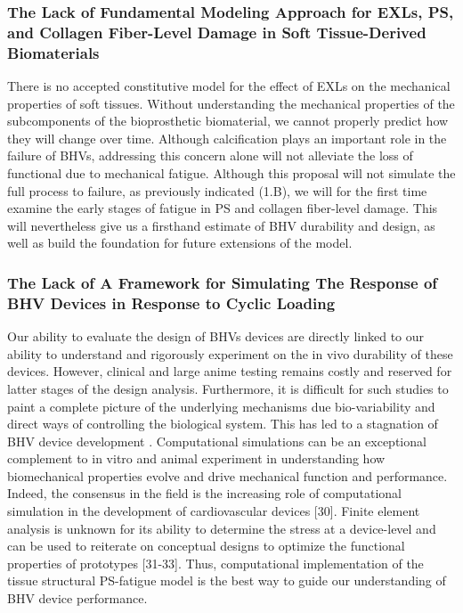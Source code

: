 \subsubsection{The Lack of Fundamental Modeling Approach for EXLs, PS, and Collagen Fiber-Level Damage in Soft Tissue-Derived Biomaterials}

    There is no accepted constitutive model for the effect of EXLs on the mechanical properties of soft tissues. Without understanding the mechanical properties of the subcomponents of the bioprosthetic biomaterial, we cannot properly predict how they will change over time. Although calcification plays an important role in the failure of BHVs, addressing this concern alone will not alleviate the loss of functional due to mechanical fatigue. Although this proposal will not simulate the full process to failure, as previously indicated (1.B), we will for the first time examine the early stages of fatigue in PS and collagen fiber-level damage. This will nevertheless give us a firsthand estimate of BHV durability and design, as well as build the foundation for future extensions of the model.

\subsubsection{The Lack of A Framework for Simulating The Response of BHV Devices in Response to Cyclic Loading}

    Our ability to evaluate the design of BHVs devices are directly linked to our ability to understand and rigorously experiment on the in vivo durability of these devices. However, clinical and large anime testing remains costly and reserved for latter stages of the design analysis. Furthermore, it is difficult for such studies to paint a complete picture of the underlying mechanisms due bio-variability and direct ways of controlling the biological system. This has led to a stagnation of BHV device development \cite{schoen_cardiac_2005}. Computational simulations can be an exceptional complement to in vitro and animal experiment in understanding how biomechanical properties evolve and drive mechanical function and performance. Indeed, the consensus in the field is the increasing role of computational simulation in the development of cardiovascular devices [30]. Finite element analysis is unknown for its ability to determine the stress at a device-level and can be used to reiterate on conceptual designs to optimize the functional properties of prototypes [31-33]. Thus, computational implementation of the tissue structural PS-fatigue model is the best way to guide our understanding of BHV device performance.

